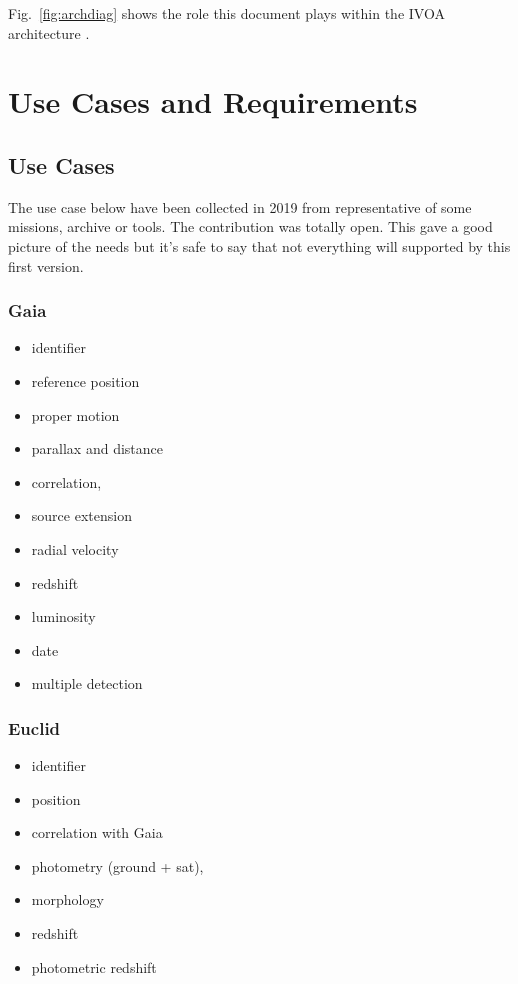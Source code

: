\documentclass[11pt,a4paper]{ivoa}
\begin{document}
Fig.~\ref{fig:archdiag} shows the role this document plays within the
IVOA architecture \citep{note:VOARCH}.



\section{Use Cases and  Requirements}

\subsection{Use Cases}
The use case below have been collected in 2019 from representative of some missions, archive or tools. The contribution was totally open. This gave a good picture of the needs but it's safe to say that not everything will supported by this first version.

\subsubsection{Gaia}
\begin{itemize}
    \item identifier
    \item reference position
    \item proper motion
    \item parallax and distance
    \item correlation,
    \item source extension
    \item radial velocity
    \item redshift
    \item luminosity
    \item date
    \item multiple detection
\end{itemize}


\subsubsection{Euclid}
\begin{itemize}    
    \item identifier
    \item position
    \item correlation with Gaia
    \item photometry (ground + sat),
    \item morphology
    \item redshift
    \item photometric redshift
\end{itemize}
\end{document}
